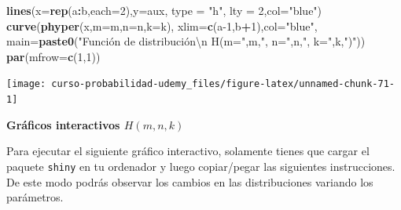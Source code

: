 \documentclass[]{book}
\newenvironment{Shaded}{\begin{snugshade}}{\end{snugshade}}
\newcommand{\DataTypeTok}[1]{\textcolor[rgb]{0.13,0.29,0.53}{#1}}
\newcommand{\DecValTok}[1]{\textcolor[rgb]{0.00,0.00,0.81}{#1}}
\newcommand{\KeywordTok}[1]{\textcolor[rgb]{0.13,0.29,0.53}{\textbf{#1}}}
\newcommand{\NormalTok}[1]{#1}
\newcommand{\OperatorTok}[1]{\textcolor[rgb]{0.81,0.36,0.00}{\textbf{#1}}}
\newcommand{\StringTok}[1]{\textcolor[rgb]{0.31,0.60,0.02}{#1}}
\begin{document}
\begin{Shaded}
\begin{Highlighting}[]
\KeywordTok{lines}\NormalTok{(}\DataTypeTok{x=}\KeywordTok{rep}\NormalTok{(a}\OperatorTok{:}\NormalTok{b,}\DataTypeTok{each=}\DecValTok{2}\NormalTok{),}\DataTypeTok{y=}\NormalTok{aux, }\DataTypeTok{type =} \StringTok{"h"}\NormalTok{, }\DataTypeTok{lty =} \DecValTok{2}\NormalTok{,}\DataTypeTok{col=}\StringTok{"blue"}\NormalTok{)}
\KeywordTok{curve}\NormalTok{(}\KeywordTok{phyper}\NormalTok{(x,}\DataTypeTok{m=}\NormalTok{m,}\DataTypeTok{n=}\NormalTok{n,}\DataTypeTok{k=}\NormalTok{k),}
  \DataTypeTok{xlim=}\KeywordTok{c}\NormalTok{(a}\DecValTok{-1}\NormalTok{,b}\OperatorTok{+}\DecValTok{1}\NormalTok{),}\DataTypeTok{col=}\StringTok{"blue"}\NormalTok{,}
  \DataTypeTok{main=}\KeywordTok{paste0}\NormalTok{(}\StringTok{"Función de distribución\textbackslash{}n H(m="}\NormalTok{,m,}\StringTok{", n="}\NormalTok{,n,}\StringTok{", k="}\NormalTok{,k,}\StringTok{")"}\NormalTok{))}
\KeywordTok{par}\NormalTok{(}\DataTypeTok{mfrow=}\KeywordTok{c}\NormalTok{(}\DecValTok{1}\NormalTok{,}\DecValTok{1}\NormalTok{))}
\end{Highlighting}
\end{Shaded}

\begin{center}\texttt{[image: curso-probabilidad-udemy\_files/figure-latex/unnamed-chunk-71-1]} \end{center}

\textbf{Gráficos interactivos \(H(m,n,k)\)}

Para ejecutar el siguiente gráfico interactivo, solamente tienes que cargar el paquete \texttt{shiny} en tu ordenador y luego copiar/pegar las siguientes instrucciones. De este modo podrás observar los cambios en las distribuciones variando los parámetros.
\end{document}
